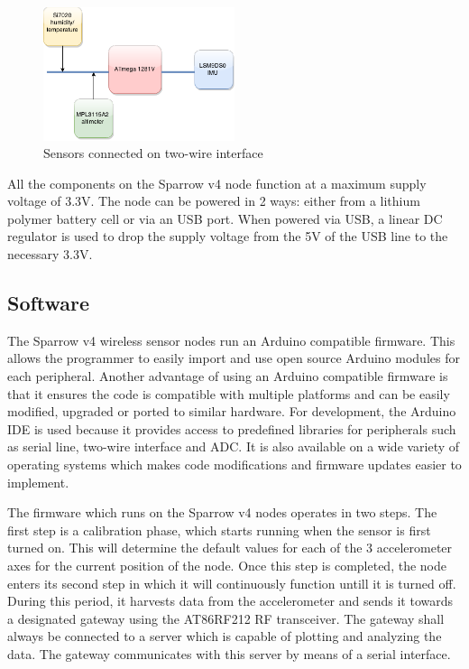 \begin{figure}[ht] \centering
  \includegraphics[width=0.5\textwidth]{img/i2c-connection.png}
  \caption{Sensors connected on two-wire interface}
\end{figure}

All the components on the Sparrow v4 node function at a maximum supply voltage of 3.3V. The node can be powered in 2 ways: either from a lithium polymer battery 
cell or via an USB port. When powered via USB, a linear DC regulator is used to drop the supply voltage from the 5V of the USB line to the necessary 3.3V.

\subsection{Software}

The Sparrow v4 wireless sensor nodes run an Arduino\cite{arduino} compatible firmware. This allows the programmer to easily import 
and use open source Arduino modules for each peripheral. Another advantage of using an Arduino compatible firmware is that it ensures the code is 
compatible with multiple platforms and can be easily modified, upgraded or ported to similar hardware. For development, the Arduino IDE is used 
because it provides access to predefined libraries for peripherals such as serial line, two-wire interface and ADC. It is also available on a wide 
variety of operating systems which makes code modifications and firmware updates easier to implement.

The firmware which runs on the Sparrow v4 nodes operates in two steps. The first step is a calibration phase, which starts running when the sensor 
is first turned on. This will determine the default values for each of the 3 accelerometer axes for the current position of the node. Once this step 
is completed, the node enters its second step in which it will continuously function untill it is turned off. During this period, it harvests data 
from the accelerometer and sends it towards a designated gateway using the AT86RF212 RF transceiver. The gateway shall always be connected to a server 
which is capable of plotting and analyzing the data. The gateway communicates with this server by means of a serial interface.

